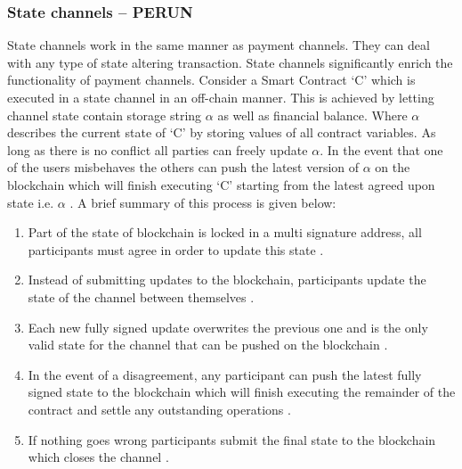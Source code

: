 \subsubsection{State channels – PERUN} \label{SCP} 
State channels work in the same manner as payment channels. They can deal with any type of state altering transaction. State channels significantly enrich the functionality of payment channels. Consider a Smart Contract ‘C’ which is executed in a state channel in an off-chain manner. This is achieved by letting channel state contain storage string $\alpha$ as well as financial balance. Where $\alpha$ describes the current state of ‘C’ by storing values of all contract variables. As long as there is no conflict all parties can freely update $\alpha$. In the event that one of the users misbehaves the others can push the latest version of $\alpha$ on the blockchain which will finish executing ‘C’ starting from the latest agreed upon state i.e. $\alpha$ \cite{misc:012}. A brief summary of this process is given below: 
\begin{enumerate}

\item Part of the state of blockchain is locked in a multi signature address, all participants must agree in order to update this state \cite{misc:012}.
\item 
Instead of submitting updates to the blockchain, participants update the state of the channel between themselves \cite{misc:012}.
\item Each new fully signed update overwrites the previous one and is the only valid state for the channel that can be pushed on the blockchain \cite{misc:012}.
\item In the event of a disagreement, any participant can push the latest fully signed state to the blockchain which will finish executing the remainder of the contract and settle any outstanding operations \cite{misc:012}.
\item If nothing goes wrong participants submit the final state to the blockchain which closes the channel \cite{ misc:012}.

\end{enumerate}
